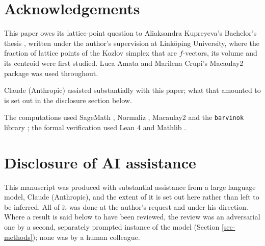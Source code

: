 \documentclass[11pt, a4paper, abstract=yes]{scrartcl}
\theoremstyle{definition}
\theoremstyle{remark}
\theoremstyle{plain}
\theoremstyle{remark}
\theoremstyle{plain}
\begin{document}
\section*{Acknowledgements}
\label{sec:org244db32}
This paper owes its lattice-point question to Aliaksandra Kupreyeva's Bachelor's thesis
\autocite{Kupreyeva2019}, written under the author's supervision at Linköping University, where the fraction of
lattice points of the Kozlov simplex that are \(f\)-vectors, its volume and its centroid were first
studied. Luca Amata and Marilena Crupi's Macaulay2 package \autocite{AmataCrupi2021} was used
throughout.

Claude (Anthropic) assisted substantially with this paper; what that amounted to is set out in the
disclosure section below.

The computations used SageMath \autocite{SageMath}, Normaliz \autocite{BrunsIchim2010}, Macaulay2
\autocite{Macaulay2} and the \texttt{barvinok} library \autocite{Verdoolaege2007}; the formal verification used
Lean 4 \autocite{deMouraUllrich2021} and Mathlib \autocite{Mathlib2020}.
\section*{Disclosure of AI assistance}
\label{sec:org2d7d463}
This manuscript was produced with substantial assistance from a large language model, Claude
(Anthropic), and the extent of it is set out here rather than left to be inferred. All of it was
done at the author's request and under his direction. Where a result is said below to have been
reviewed, the review was an adversarial one by a second, separately prompted instance of the model
(Section \ref{sec-methods}); none was by a human colleague.
\end{document}
